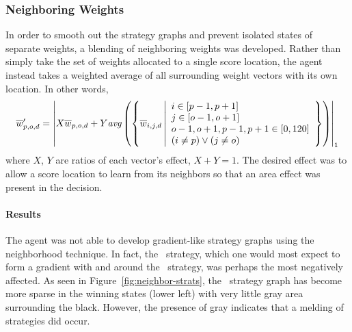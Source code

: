 

\subsubsection*{Neighboring Weights}
\label{sec:findings-expts-neighbors}


In order to smooth out the strategy graphs
and prevent isolated states of separate weights,
a blending of neighboring weights was developed.
%
Rather than simply take the set of weights allocated to a single score location,
the agent instead takes a weighted average of all surrounding weight vectors
with its own location.
%
In other words,
\[
    \wvecm'_{p,o,d} = %
    \left|
    X\wvecm_{p,o,d} +
    Y \textit{avg}\left(\left\{
        \wvecm_{i,j,d}\,
        \middle|
        \begin{array}{ll}
        i \in [p-1,p+1]\\
        j \in [o-1, o+1]\\
        o-1,o+1,p-1,p+1 \in [0,120]\\
        (i \neq p) \lor (j \neq o)
        \end{array}
        \right\} %
    \right)
    \right|_1
\]
where $X$, $Y$ are ratios of each vector's effect, $X+Y = 1$.
%
The desired effect was to allow a score location to learn from its neighbors
so that an area effect was present in the decision.


\paragraph*{Results}





The agent was not
able to develop gradient-like strategy graphs
using the neighborhood technique.
%
In fact,
the \handmaxavg\ strategy,
which one would most expect to form a gradient with and around the
\handmaxmin\ strategy,
was perhaps the most negatively affected.
%
As seen in Figure~\ref{fig:neighbor-strats},
the \handmaxavg\ strategy graph has become more sparse in the winning
states (lower left)
with very little gray area surrounding the black.
%
However,
the presence of gray
indicates that a melding of strategies did occur.

